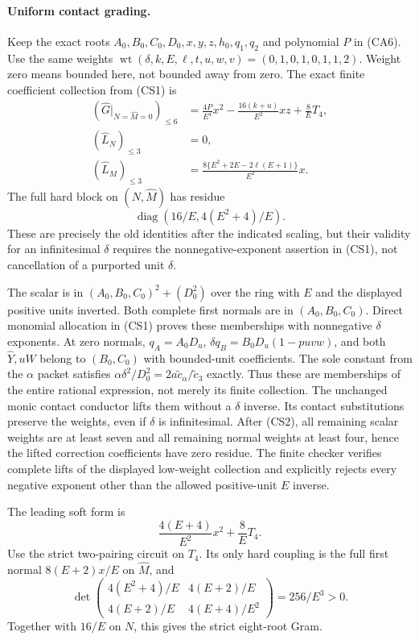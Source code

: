 \paragraph{Uniform contact grading.}
Keep the exact roots $A_0,B_0,C_0,D_0,x,y,z,h_0,q_1,q_2$ and polynomial
$P$ in (CA6). Use the same weights
$\operatorname{wt}(\delta,k,E,\ell,t,u,w,v)=(0,1,0,1,0,1,1,2)$.
Weight zero means bounded here, not bounded away from zero.
The exact finite coefficient collection from (CS1) is
\[
 \begin{aligned}
 (\widehat G|_{N=\widehat M=0})_{\le6}
 &=\frac{4P}{E^4}x^2-\frac{16(k+u)}{E^2}xz+\frac8E T_4,\\
 (\widehat L_N)_{\le3}&=0,\\
 (\widehat L_M)_{\le3}
 &=\frac{8\{E^2+2E-2\ell(E+1)\}}{E^2}x.
 \end{aligned}                                                    \tag{CS2}
\]
The full hard block on $(N,\widehat M)$ has residue
\[
        \operatorname{diag}(16/E,4(E^2+4)/E).          \tag{CS3}
\]
These are precisely the old identities after the indicated scaling,
but their validity for an infinitesimal $\delta$ requires the
nonnegative-exponent assertion in (CS1), not cancellation of a
purported unit $\delta$.

The scalar is in
$(A_0,B_0,C_0)^2+(D_0^2)$ over the ring with $E$ and the displayed
positive units inverted. Both complete first normals are in
$(A_0,B_0,C_0)$. Direct monomial allocation in (CS1) proves these
memberships with nonnegative $\delta$ exponents. At zero normals,
$q_A=A_0D_u$, $\delta q_B=B_0D_u(1-puv w)$, and both
$\widehat Y,u\widehat W$ belong to $(B_0,C_0)$ with bounded-unit
coefficients. The sole constant from the $\alpha$ packet satisfies
$\alpha\delta^2/D_0^2=2a\widetilde c_\alpha/\widetilde c_3$ exactly.
Thus these are memberships of the entire rational expression, not merely
its finite collection. The unchanged monic
contact conductor lifts them without a $\delta$ inverse. Its contact
substitutions preserve the weights, even if $\delta$ is infinitesimal.
After (CS2), all remaining scalar weights are at least seven and all
remaining normal weights at least four, hence the lifted correction
coefficients have zero residue. The finite checker verifies complete lifts of the displayed low-weight
collection and explicitly rejects every negative exponent other
than the allowed positive-unit $E$ inverse.

The leading soft form is
\[
            \frac{4(E+4)}{E^2}x^2+\frac8E T_4.
\]
Use the strict two-pairing circuit on $T_4$. Its only hard coupling
is the full first normal $8(E+2)x/E$ on $\widehat M$, and
\[
 \det\begin{pmatrix}4(E^2+4)/E&4(E+2)/E\\
                    4(E+2)/E&4(E+4)/E^2\end{pmatrix}
                   =256/E^3>0.                       \tag{CS4}
\]
Together with $16/E$ on $N$, this gives the strict eight-root Gram.

